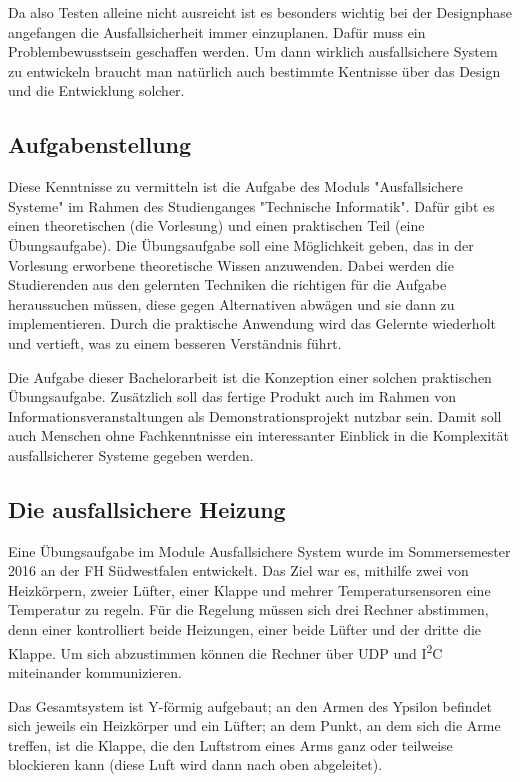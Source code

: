 Da also Testen alleine nicht ausreicht ist es besonders wichtig bei der Designphase angefangen die Ausfallsicherheit immer einzuplanen. Daf{\"{u}}r
muss ein Problembewusstsein geschaffen werden. Um dann wirklich ausfallsichere System zu entwickeln braucht man nat{\"{u}}rlich auch bestimmte Kentnisse 
{\"{u}}ber das Design und die Entwicklung solcher.

\subsection{Aufgabenstellung} 
Diese Kenntnisse zu vermitteln ist die Aufgabe des Moduls "Ausfallsichere Systeme" im Rahmen des Studienganges 
"Technische Informatik". Daf{\"{u}}r gibt es einen theoretischen (die Vorlesung) und einen praktischen Teil (eine 
{\"{U}}bungsaufgabe). Die {\"{U}}bungsaufgabe soll eine M{\"{o}}glichkeit geben, das in der Vorlesung erworbene 
theoretische Wissen anzuwenden. Dabei werden die Studierenden aus den gelernten Techniken die richtigen 
f{\"{u}}r die Aufgabe heraussuchen m{\"{u}}ssen, diese gegen Alternativen abw{\"{a}}gen und sie dann zu 
implementieren. Durch die  praktische Anwendung wird das Gelernte wiederholt und vertieft, was zu einem besseren 
Verst{\"{a}}ndnis f{\"{u}}hrt. 

Die Aufgabe dieser Bachelorarbeit ist die Konzeption einer solchen praktischen {\"{U}}bungsaufgabe. 
Zus{\"{a}}tzlich soll das fertige Produkt auch im Rahmen von Informationsveranstaltungen als Demonstrationsprojekt 
nutzbar sein. Damit soll auch Menschen ohne Fachkenntnisse ein interessanter Einblick in die 
Komplexit{\"{a}}t ausfallsicherer Systeme gegeben werden.

\subsection{Die ausfallsichere Heizung}\label{heizung}
Eine {\"{U}}bungsaufgabe im Module Ausfallsichere System wurde im Sommersemester 2016 an der FH S{\"{u}}dwestfalen entwickelt. Das Ziel war es, mithilfe zwei von Heizk{\"{o}}rpern, zweier
L{\"{u}}fter, einer Klappe und mehrer Temperatursensoren eine Temperatur zu regeln. F{\"{u}}r die Regelung m{\"{u}}ssen sich drei Rechner abstimmen, denn einer kontrolliert
beide Heizungen, einer beide L{\"{u}}fter und der dritte die Klappe. Um sich abzustimmen k{\"{o}}nnen die Rechner {\"{u}}ber UDP und I\textsuperscript{2}C miteinander kommunizieren.

Das Gesamtsystem ist Y-f{\"{o}}rmig aufgebaut; an den Armen des Ypsilon befindet sich jeweils ein Heizk{\"{o}}rper und ein L{\"{u}}fter; an dem Punkt, an dem sich
die Arme treffen, ist die Klappe, die den Luftstrom eines Arms ganz oder teilweise blockieren kann (diese Luft wird dann nach oben abgeleitet).

